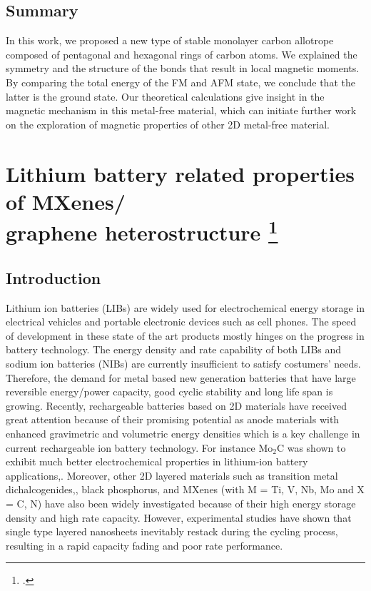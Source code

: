 \subsection{Summary}
In this work, we proposed a new type of stable monolayer carbon allotrope composed of pentagonal and hexagonal rings of carbon atoms. We explained the symmetry and the structure of the bonds that result in local magnetic moments. By comparing the total energy of the FM and AFM state, we conclude that the latter is the ground state. Our theoretical calculations give insight in the magnetic mechanism in this metal-free material, which can initiate further work on the exploration of magnetic properties of other 2D metal-free material. 


\section[Lithium battery related properties of MXenes/ \\ graphene heterostructure]{Lithium battery related properties of MXenes/ \protect\\ graphene heterostructure \footcite[This work is submitted:][]{Aierken2017.battery} \label{Li_MG}}

\subsection{Introduction}
Lithium ion batteries (LIBs) are widely used for electrochemical energy storage in electrical vehicles and portable electronic devices such as cell phones. The speed of development in these state of the art products mostly hinges on the progress in battery technology. The energy density and rate capability of both LIBs and sodium ion batteries (NIBs) are currently insufficient to satisfy costumers' needs. Therefore, the demand for metal based new generation batteries that have large reversible energy/power capacity, good cyclic stability and long life span is growing. Recently, rechargeable batteries based on 2D materials have received great attention because of their promising potential as anode materials with enhanced gravimetric and volumetric energy densities which is a key challenge in current rechargeable ion battery technology. For instance Mo$_2$C was shown to exhibit much better electrochemical properties in lithium-ion battery applications,\cite{mo2c-ref8}. Moreover, other 2D layered materials such as transition metal dichalcogenides,\cite{mo2c-ref11, mo2c-ref12}, black phosphorus\cite{mo2c-ref18, mo2c-ref20}, and MXenes (with M = Ti, V, Nb, Mo and X = C, N)\cite{mo2c-ref13} have also been widely investigated because of their high energy storage density and high rate capacity. However, experimental studies have shown that single type layered nanosheets inevitably restack during the cycling process, resulting in a rapid capacity fading and poor rate performance. 

